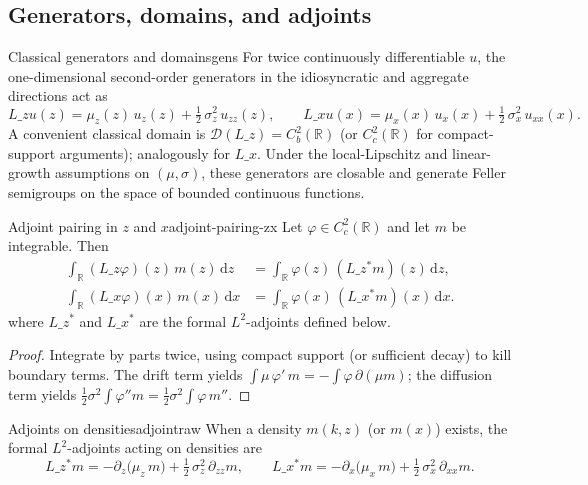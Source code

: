 ﻿\documentclass[11pt,letterpaper,oneside]{article}
\numberwithin{equation}{section}
\newcommand{\R}{\mathbb{R}}
\newcommand{\1}{\mathbf{1}}
\newcommand{\Lz}{L\_z}
\newcommand{\Lx}{L\_x}
\newcommand{\Lzadj}{L\_z^{\!*}}
\begin{document}
\subsection{Generators, domains, and adjoints}\label{sec:generators}

\begin{definition}{Classical generators and domains}{gens}
For twice continuously differentiable $u$, the one-dimensional second-order generators in the idiosyncratic and aggregate directions act as
\[
\Lz u(z)=\mu_z(z)\,u_z(z)+\tfrac12\,\sigma_z^2\,u_{zz}(z),\qquad
\Lx u(x)=\mu_x(x)\,u_x(x)+\tfrac12\,\sigma_x^2\,u_{xx}(x).
\]
A convenient classical domain is $\mathcal D(\Lz)=C_b^2(\R)$ (or $C_c^2(\R)$ for compact-support arguments); analogously for $\Lx$. Under the local-Lipschitz and linear-growth assumptions on $(\mu,\sigma)$, these generators are closable and generate Feller semigroups on the space of bounded continuous functions.
\end{definition}

\begin{lemma}{Adjoint pairing in $z$ and $x$}{adjoint-pairing-zx}
Let $\varphi\in C_c^2(\R)$ and let $m$ be integrable. Then
\[
\begin{aligned}
\int_{\R} (\Lz \varphi)(z)\, m(z)\,\mathrm dz &= \int_{\R} \varphi(z)\, (\Lzadj m)(z)\,\mathrm dz, \\
\int_{\R} (\Lx \varphi)(x)\, m(x)\,\mathrm dx &= \int_{\R} \varphi(x)\, (\Lx^{\!*} m)(x)\,\mathrm dx.
\end{aligned}
\]
where $\Lzadj$ and $\Lx^{\!*}$ are the formal $L^2$-adjoints defined below.
\end{lemma}

\begin{proof}
Integrate by parts twice, using compact support (or sufficient decay) to kill boundary terms. The drift term yields $\int \mu\,\varphi'\,m = -\int \varphi\,\partial(\mu m)$; the diffusion term yields $\tfrac12\sigma^2\int \varphi'' m = \tfrac12\sigma^2\int \varphi\, m''$.
\end{proof}

\begin{definition}{Adjoints on densities}{adjointraw}
When a density $m(k,z)$ (or $m(x)$) exists, the formal $L^2$-adjoints acting on densities are
\[
\Lzadj m = -\partial_z\big(\mu_z\, m\big) + \tfrac12\, \sigma_z^2\, \partial_{zz} m,\qquad
\Lx^{\!*} m = -\partial_x\big(\mu_x\, m\big) + \tfrac12\, \sigma_x^2\, \partial_{xx} m.
\]
\end{definition}
\end{document}
